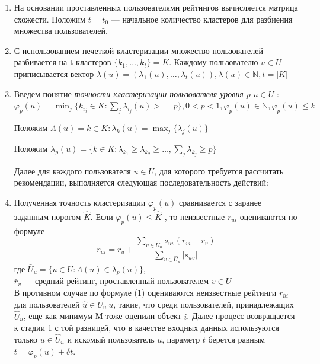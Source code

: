 \documentclass[a4paper, 12pt]{article} %
\begin{document}
\begin{enumerate} 


\item 
На основании проставленных пользователями рейтингов вычисляется матрица схожести. Положим $t = t_{0}$ --- начальное количество кластеров для разбиения множества пользователей.


\item 
С использованием нечеткой кластеризации множество пользователей разбивается на t кластеров $\{k_{1},\dots,k_{t}\}=K$.
Каждому пользователю $u \in U$ приписывается вектор $\lambda(u)=(\lambda_{1}(u),\dots,\lambda_{t}(u)), \lambda(u)\in\mathbb{N}, t=|K|$

\item
Введем понятие \textit{точности кластеризации пользователя уровня $p$} $u \in U$ :
$\varphi_{p}(u) = \min_{j} \{k_{i_{j}} \in K: \sum_{j} \lambda_{i_{j}}(u) >= p\}, 0 < p < 1, \varphi_{p}(u) \in \mathbb{N}, \varphi_{p}(u) \leq k$ 
\par
Положим $\Lambda(u) = k \in K: \lambda_{k}(u) = \max_{j} \{\lambda_{j}(u)\}$ 
\par
Положим $\lambda_{p}(u) = \{k \in K: \lambda_{k_{1}} \geq\lambda_{k_{2}} \geq\dots, \sum_{j}\lambda_{k_{j}} \geq p\}$

Далее для каждого пользователя $u \in U$, для которого требуется рассчитать рекомендации, выполняется следующая последовательность действий: 

\item Полученная точность кластеризации $\varphi_{p}(u)$ сравнивается с заранее заданным порогом $\hat{K}$. Если $\varphi_{p}(u) \leq \hat{K}$ , то неизвестные $r_{ui}$ оцениваются по формуле 
\begin{equation}
	r_{ui} = \bar{r}_{u} + \frac{\sum_{v \in \hat{U}_{u}} s_{uv}(r_{vi} - \bar{r}_v)}{\sum_{v \in \hat{U}_{u}} |s_{uv}|}
\end{equation}
где $\bar{U}_{u} = \{u \in U:\Lambda(u) \in  \lambda_{p}(u)\}$,\\ $\bar{r}_{v}$ --- средний рейтинг, проставленный пользователем $v \in U$\\
В противном случае по формуле (1) оцениваются неизвестные рейтинги $r_{\hat{u}i}$ для пользователей $\hat{u} \in \hat{U}_{u} \ u$, такие, что среди пользователей, принадлежащих $\hat{U}_{u}$, еще как минимум М тоже оценили объект $i$. Далее процесс возвращается к стадии 1 с той разницей, что в качестве входных данных используются только $u \in \hat{U}_{u}$ и искомый пользователь $u$, параметр $t$ берется равным $t = \varphi_{p}(u)  + \delta t$.

\end{enumerate}
\end{document}
